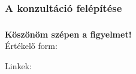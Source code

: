 \documentclass[xcolor={table},aspectratio=1610]{beamer}
\institute{Mechatronika szakosztály}
\begin{document}
\frame{\titlepage}

\begin{frame}
  \frametitle{A konzultáció felépítése}
  \framesubtitle{\;}
  \tableofcontents
\end{frame}




\begin{frame}
  \frametitle{\;}
  \framesubtitle{\;}

  \centering
  {
    \LARGE\bfseries
    Köszönöm szépen a figyelmet!
  }
  \\[5mm]
  Értékelő form:
  \\[2mm]

  \vfill
  \small

  Linkek: 
\end{frame}
\end{document}
